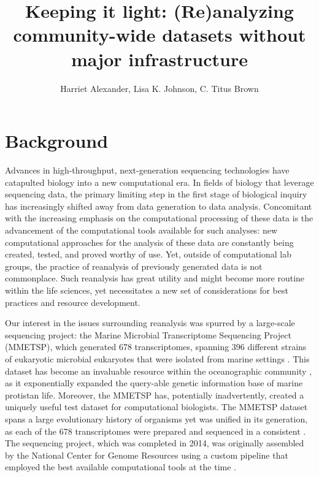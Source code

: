 \documentclass[12pt]{article}
\title{Keeping it light: (Re)analyzing community-wide datasets without major infrastructure}
\author{Harriet Alexander, Lisa K. Johnson, C. Titus Brown}
\begin{document}
  \maketitle


\section{Background}
Advances in high-throughput, next-generation sequencing technologies have catapulted biology into a new computational era. In fields of biology that leverage sequencing data, the primary limiting step in the first stage of biological inquiry has increasingly shifted away from data generation to data analysis. Concomitant with the increasing emphasis on the computational processing of these data is the advancement of the computational tools available for such analyses: new computational approaches for the analysis of these data are constantly being created, tested, and proved worthy of use. Yet, outside of computational lab groups, the practice of reanalysis of previously generated data is not commonplace. Such reanalysis has great utility and might become more routine within the life sciences, yet necessitates a new set of considerations for best practices and resource development.



Our interest in the issues surrounding reanalysis was spurred by a large-scale sequencing project: the Marine Microbial Transcriptome Sequencing Project (MMETSP), which generated 678 transcriptomes, spanning 396 different strains of eukaryotic microbial eukaryotes that were isolated from marine settings \cite{Caron2016}. This dataset has become an invaluable resource within the oceanographic community \cite{Keeling2014, Caron2016}, as it exponentially expanded the query-able genetic information base of marine protistan life. Moreover, the MMETSP has, potentially inadvertently, created a uniquely useful test dataset for computational biologists. The MMETSP dataset spans a large evolutionary history of organisms yet was unified in its generation, as each of the 678 transcriptomes were prepared and sequenced in a consistent \cite{Keeling2014}. The sequencing project, which was completed in 2014, was originally assembled by the National Center for Genome Resources using a custom pipeline that employed the best available computational tools at the time \cite{Simpson2009, Huang1999}.
\end{document}
